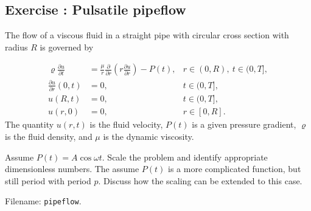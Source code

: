 \documentclass[graybox,envcountchap,sectrefs,final]{svmonodo}
\newenvironment{doconceexercise}{}{}
\newcounter{doconceexercisecounter}
\begin{document}
\begin{doconceexercise}

\subsection*{Exercise \thedoconceexercisecounter: Pulsatile pipeflow}

\label{scale:exer:pipeflow:pulsatile}

The flow of a viscous fluid in a straight pipe with circular
cross section with radius $R$ is governed by

\begin{align}
\varrho\frac{\partial u}{\partial t} &= \frac{\mu}{r}\frac{\partial}{\partial r}
\left(r\frac{\partial u}{\partial r}\right) - P(t), & r\in (0,R),\ t\in (0,T],\\ 
\frac{\partial u}{\partial r}(0,t) &= 0, & t\in (0,T],\\ 
u(R,t) &= 0, & t\in (0,T],\\ 
u(r,0) &= 0, & r\in [0,R].
\end{align}
The quantity $u(r,t)$ is the fluid velocity, $P(t)$ is a given
pressure gradient, $\varrho$ is the fluid density, and $\mu$ is the
dynamic viscosity.

Assume $P(t) = A\cos\omega t$. Scale the problem and identify
appropriate dimensionless numbers. The assume $P(t)$ is a more
complicated function, but still period with period $p$.
Discuss how the scaling can be extended to this case.


\noindent Filename: \texttt{pipeflow}.

\end{doconceexercise}
\end{document}
